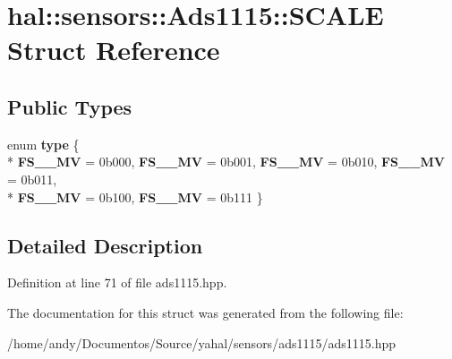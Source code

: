 \hypertarget{structhal_1_1sensors_1_1_ads1115_1_1_s_c_a_l_e}{}\section{hal\+:\+:sensors\+:\+:Ads1115\+:\+:S\+C\+A\+L\+E Struct Reference}
\label{structhal_1_1sensors_1_1_ads1115_1_1_s_c_a_l_e}
\subsection*{Public Types}
\begin{DoxyCompactItemize}
\item 
\hypertarget{structhal_1_1sensors_1_1_ads1115_1_1_s_c_a_l_e_a2f7392ca88e69800a9b196d46da27239}{}enum {\bfseries type} \{ \\*
{\bfseries F\+S\+\_\+\_\+\+M\+V} = 0b000, 
{\bfseries F\+S\+\_\+\_\+\+M\+V} = 0b001, 
{\bfseries F\+S\+\_\+\_\+\+M\+V} = 0b010, 
{\bfseries F\+S\+\_\+\_\+\+M\+V} = 0b011, 
\\*
{\bfseries F\+S\+\_\+\_\+\+M\+V} = 0b100, 
{\bfseries F\+S\+\_\+\_\+\+M\+V} = 0b111
 \}\label{structhal_1_1sensors_1_1_ads1115_1_1_s_c_a_l_e_a2f7392ca88e69800a9b196d46da27239}

\end{DoxyCompactItemize}


\subsection{Detailed Description}


Definition at line 71 of file ads1115.\+hpp.



The documentation for this struct was generated from the following file\+:\begin{DoxyCompactItemize}
\item 
/home/andy/\+Documentos/\+Source/yahal/sensors/ads1115/ads1115.\+hpp\end{DoxyCompactItemize}
